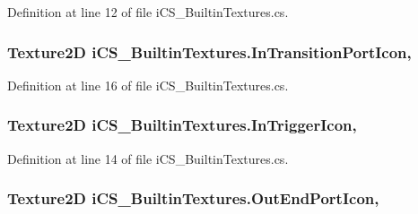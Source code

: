 Definition at line 12 of file i\+C\+S\+\_\+\+Builtin\+Textures.\+cs.

\hypertarget{classi_c_s___builtin_textures_a7e4b82d7c83d3d4107e558bb2aadde91}{
\subsubsection[{In\+Transition\+Port\+Icon}]{\setlength{\rightskip}{0pt plus 5cm}Texture2\+D i\+C\+S\+\_\+\+Builtin\+Textures.\+In\+Transition\+Port\+Icon\hspace{0.3cm}{\ttfamily [static]}, {\ttfamily [get]}}}\label{classi_c_s___builtin_textures_a7e4b82d7c83d3d4107e558bb2aadde91}


Definition at line 16 of file i\+C\+S\+\_\+\+Builtin\+Textures.\+cs.

\hypertarget{classi_c_s___builtin_textures_a8d0d47bcb018078d75cd70f7e9920d5a}{
\subsubsection[{In\+Trigger\+Icon}]{\setlength{\rightskip}{0pt plus 5cm}Texture2\+D i\+C\+S\+\_\+\+Builtin\+Textures.\+In\+Trigger\+Icon\hspace{0.3cm}{\ttfamily [static]}, {\ttfamily [get]}}}\label{classi_c_s___builtin_textures_a8d0d47bcb018078d75cd70f7e9920d5a}


Definition at line 14 of file i\+C\+S\+\_\+\+Builtin\+Textures.\+cs.

\hypertarget{classi_c_s___builtin_textures_a2e47fb67d846995227f092b9fac02ff4}{
\subsubsection[{Out\+End\+Port\+Icon}]{\setlength{\rightskip}{0pt plus 5cm}Texture2\+D i\+C\+S\+\_\+\+Builtin\+Textures.\+Out\+End\+Port\+Icon\hspace{0.3cm}{\ttfamily [static]}, {\ttfamily [get]}}}\label{classi_c_s___builtin_textures_a2e47fb67d846995227f092b9fac02ff4}


